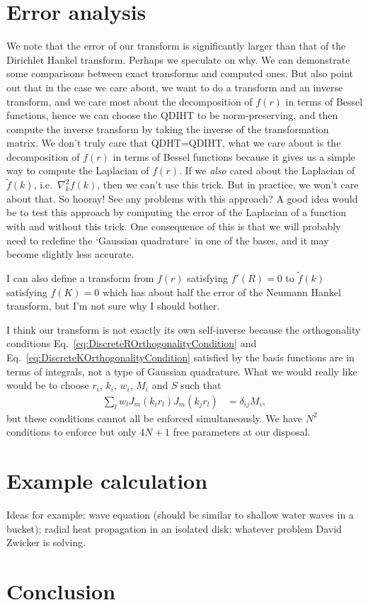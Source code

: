 \documentclass[aip,amsmath,amssymb,reprint,twocolumn]{revtex4-1}
\begin{document}
\section{Error analysis}
\label{sec:ErrorAnalysis}

We note that the error of our transform is significantly larger than that of the Dirichlet Hankel transform.  Perhaps we speculate on why.  We can demonstrate some comparisons between exact transforms and computed ones.  But also point out that in the case we care about, we want to do a transform and an inverse transform, and we care most about the decomposition of $f(r)$ in terms of Bessel functions, hence we can choose the QDIHT to be norm-preserving, and then compute the inverse transform by taking the inverse of the transformation matrix.  We don't truly care that QDHT=QDIHT, what we care about is the decomposition of $f(r)$ in terms of Bessel functions because it gives us a simple way to compute the Laplacian of $f(r)$.  If we \emph{also} cared about the Laplacian of $\tilde{f}(k)$, i.e.\ $\nabla_k^2 f(k)$, then we can't use this trick.  But in practice, we won't care about that. So hooray!  See any problems with this approach?  A good idea would be to test this approach by computing the error of the Laplacian of a function with and without this trick.  One consequence of this is that we will probably need to redefine the `Gaussian quadrature' in one of the bases, and it may become slightly less accurate.

I can also define a transform from $f(r)$ satisfying $f'(R)=0$ to $\tilde{f}(k)$ satisfying $f(K)=0$ which has about half the error of the Neumann Hankel transform, but I'm not sure why I should bother.

I think our transform is not exactly its own self-inverse because the orthogonality conditions Eq.~\eqref{eq:DiscreteROrthogonalityCondition} and Eq.~\eqref{eq:DiscreteKOrthogonalityCondition} satisfied by the basis functions are in terms of integrals, not a type of Gaussian quadrature.  What we would really like would be to choose $r_i$, $k_i$, $w_i$, $M_i$ and $S$ such that
\begin{align}
  \sum_l w_l J_m(k_i r_l) J_m(k_j r_l) &= \delta_{ij} M_i,
\end{align}
but these conditions cannot all be enforced simultaneously.  We have $N^2$ conditions to enforce but only $4N+1$ free parameters at our disposal.

\section{Example calculation}
\label{sec:Example}
Ideas for example: wave equation (should be similar to shallow water waves in a bucket); radial heat propagation in an isolated disk; whatever problem David Zwicker is solving.

\section{Conclusion}
\label{sec:Conclusion}




\end{document}
